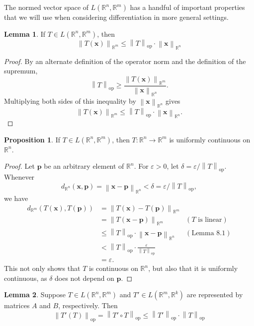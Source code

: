 \documentclass{article}
\newcommand{\R}{\mathbb{R}}
\newcommand{\x}{\mathbf{x}}
\newcommand{\norm}[1]{\left\lVert#1\right\rVert}
\newcommand{\normop}[1]{\left\lVert#1\right\rVert_\text{op}}
\theoremstyle{definition}
\newtheorem{proposition}{Proposition}[section]
\newtheorem{lemma}{Lemma}[section]
\begin{document}
	The normed vector space of $ L(\R^n,\R^m) $ has a handful of important properties that we will use when considering differentiation in more general settings. 
	\begin{lemma}
		If $ T\in L(\R^n,\R^m) $, then $$ \norm{T(\x)}_{\R^m}\le \normop{T}\cdot\norm{\x}_{\R^n} $$
	\end{lemma}
	\begin{proof}
		By an alternate definition of the operator norm and the definition of the supremum, 
		$$\norm{T}_\text{op} \ge  \frac{\norm{T(\x)}_{\R^m}}{\norm{\x}_{\R^n}}.$$
		Multiplying both sides of this inequality by $ \norm{\x}_{\R^n} $ gives 
		$$  \norm{T(\x)}_{\R^m}\le \normop{T}\cdot\norm{\x}_{\R^n} .$$ 
	\end{proof}
	\begin{proposition}
		If $ T\in L(\R^n,\R^m) $, then $ T:\R^n\to\R^m $ is uniformly continuous on $ \R^n $.
	\end{proposition}
	\begin{proof}
		Let $ \mathbf p $ be an arbitrary element of $ \R^n $. For $ \varepsilon > 0 $, let $ \delta = \varepsilon/\normop{T} $. Whenever $$ d_{\R^n}(\x, \mathbf p) = \norm{\x - \mathbf p}_{\R^n} < \delta = \varepsilon/\normop{T},$$ we have 
		\begin{align*}
			d_{\R^m}(T(\x), T(\mathbf p)) &= \norm{T(\x) - T(\mathbf p) }_{\R^m} \\ &= \norm{T(\x - \mathbf p) }_{\R^m}	&(T \text{ is linear})\\ & \le \normop{T}\cdot \norm{\x - \mathbf p}_{\R^n} & (\text{Lemma 8.1})\\
			& < \normop{T}\cdot\frac{\varepsilon}{\normop{T}}\\
			& = \varepsilon.
		\end{align*}
		This not only shows that $ T $ is continuous on $ \R^n $, but also that it is uniformly continuous, as $ \delta $ does not depend on $ \mathbf p $. 
	\end{proof}
	\begin{lemma}
		Suppose $ T\in L(\R^n,\R^m) $ and $ T'\in L(\R^m,\R^k) $ are represented by matrices $ A $ and $ B $, respectively. Then $$ \normop{T'(T)} = \normop{T'\circ T} \le \normop{T'}\cdot\normop{T}$$
	\end{lemma}
\end{document}
